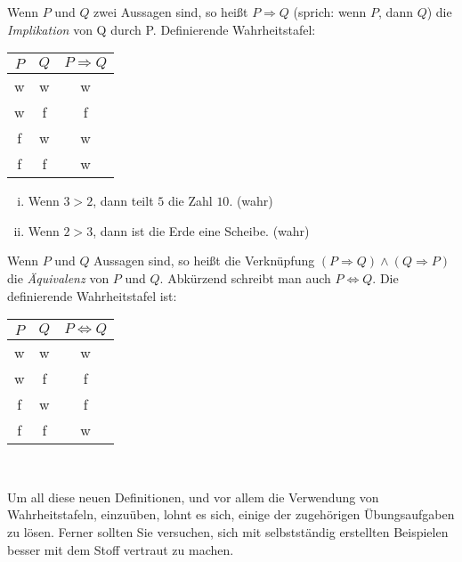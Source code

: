 \begin{mydef}
    Wenn $P$ und $Q$ zwei Aussagen sind, so heißt $P \Rightarrow Q$ (sprich: wenn $P$, dann $Q$) die \textit{Implikation} von Q durch P. 
    Definierende Wahrheitstafel: \newline
    \begin{tabular}{ c | c | c }
        $P$ & $Q$ & $P \Rightarrow Q$ \\
        \hline
        w & w & w \\
        w & f & f \\
        f & w & w \\
        f & f & w \\
    \end{tabular}
\end{mydef}

\begin{example}
    \begin{enumerate}[(i)]
        \item 
        Wenn $ 3 > 2$, dann teilt $5$ die Zahl $10$.  (wahr)
        \item 
        Wenn $2 > 3$, dann ist die Erde eine Scheibe. (wahr)
    \end{enumerate}
\end{example}

\begin{mydef}
    Wenn $P$ und $Q$ Aussagen sind, so heißt die Verknüpfung $(P \Rightarrow Q) \wedge (Q \Rightarrow P)$ die \textit{Äquivalenz} von $P$ und $Q$. 
    Abkürzend schreibt man auch $P \iff Q$. Die definierende Wahrheitstafel ist: \newline
    \begin{tabular}{ c | c | c }
        $P$ & $Q$ & $P \iff Q$ \\
        \hline
        w & w & w \\
        w & f & f \\
        f & w & f \\
        f & f & w \\
    \end{tabular}
\end{mydef}\ 
\newline 

Um all diese neuen Definitionen, und vor allem die Verwendung von Wahrheitstafeln, einzuüben, lohnt es sich, einige der zugehörigen Übungsaufgaben zu lösen. 
Ferner sollten Sie versuchen, sich mit selbstständig erstellten Beispielen besser mit dem Stoff vertraut zu machen. 